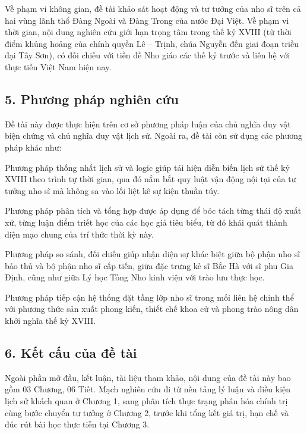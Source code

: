 Về phạm vi không gian, đề tài khảo sát hoạt động và tư tưởng của nho sĩ trên cả hai vùng lãnh thổ Đàng Ngoài và Đàng Trong của nước Đại Việt. Về phạm vi thời gian, nội dung nghiên cứu giới hạn trọng tâm trong thế kỷ XVIII (từ thời điểm khủng hoảng của chính quyền Lê -- Trịnh, chúa Nguyễn đến giai đoạn triều đại Tây Sơn), có đối chiếu với tiền đề Nho giáo các thế kỷ trước và liên hệ với thực tiễn Việt Nam hiện nay.

\subsection*{5. Phương pháp nghiên cứu}

Đề tài này được thực hiện trên cơ sở phương pháp luận của chủ nghĩa duy vật biện chứng và chủ nghĩa duy vật lịch sử. Ngoài ra, đề tài còn sử dụng các phương pháp khác như:

Phương pháp thống nhất lịch sử và logic giúp tái hiện diễn biến lịch sử thế kỷ XVIII theo trình tự thời gian, qua đó nắm bắt quy luật vận động nội tại của tư tưởng nho sĩ mà không sa vào lối liệt kê sự kiện thuần túy.

Phương pháp phân tích và tổng hợp được áp dụng để bóc tách từng thái độ xuất xử, từng luận điểm triết học của các học giả tiêu biểu, từ đó khái quát thành diện mạo chung của trí thức thời kỳ này.

Phương pháp so sánh, đối chiếu giúp nhận diện sự khác biệt giữa bộ phận nho sĩ bảo thủ và bộ phận nho sĩ cấp tiến, giữa đặc trưng kẻ sĩ Bắc Hà với sĩ phu Gia Định, cũng như giữa Lý học Tống Nho kinh viện với trào lưu thực học.

Phương pháp tiếp cận hệ thống đặt tầng lớp nho sĩ trong mối liên hệ chỉnh thể với phương thức sản xuất phong kiến, thiết chế khoa cử và phong trào nông dân khởi nghĩa thế kỷ XVIII.

\subsection*{6. Kết cấu của đề tài}

Ngoài phần mở đầu, kết luận, tài liệu tham khảo, nội dung của đề tài này bao gồm 03 Chương, 06 Tiết. Mạch nghiên cứu đi từ nền tảng lý luận và điều kiện lịch sử khách quan ở Chương 1, sang phân tích thực trạng phân hóa chính trị cùng bước chuyển tư tưởng ở Chương 2, trước khi tổng kết giá trị, hạn chế và đúc rút bài học thực tiễn tại Chương 3.
